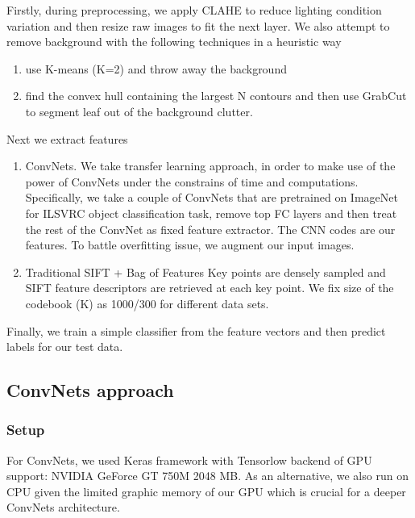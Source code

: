 \documentclass[journal, 10pt]{IEEEtran}
\begin{document}
Firstly, during preprocessing, we apply CLAHE\cite{CLAHE} to reduce lighting condition variation and then resize raw images to fit the next layer. We also attempt to remove background with the following techniques in a heuristic way
  \begin{enumerate}
    \item use K-means (K=2) and throw away the background
    \item find the convex hull containing the largest N contours and then use GrabCut\cite{Grabcut} to segment leaf out of the background clutter.
  \end{enumerate}
  Next we extract features
\begin{enumerate}
  \item ConvNets.
    We take transfer learning approach, in order to make use of the power of ConvNets under the constrains of time and computations. Specifically, we take a couple of ConvNets that are pretrained on ImageNet for ILSVRC object classification task, remove top FC layers and then treat the rest of the ConvNet as fixed feature extractor. The CNN codes are our features. To battle overfitting issue, we augment our input images.
  \item Traditional SIFT + Bag of Features
    Key points are densely sampled and SIFT feature descriptors are retrieved at each key point. We fix size of the codebook (K) as 1000/300 for different data sets.
\end{enumerate}
Finally,  we train a simple classifier from the feature vectors and then predict labels for our test data.


\subsection{ConvNets approach}
  \subsubsection{Setup}
  For ConvNets, we used Keras framework \cite{Keras} with Tensorlow backend of GPU support: NVIDIA GeForce GT 750M 2048 MB. As an alternative, we also run on CPU given the limited graphic memory of our GPU which is crucial for a deeper ConvNets architecture.
\end{document}

